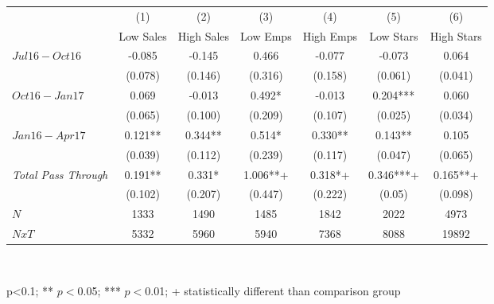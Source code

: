 \begin{center}
\begin{tabular}{lcccccc}
\hline  & (1) & (2) & (3) & (4) & (5) & (6)\\
 & Low Sales & High Sales & Low Emps & High Emps & Low Stars & High Stars\\
\hline  $ Jul16-Oct16 $  & -0.085 & -0.145 & 0.466 & -0.077 & -0.073 & 0.064\\
 & (0.078) & (0.146) & (0.316) & (0.158) & (0.061) & (0.041)\\
 $ Oct16-Jan17 $  & 0.069 & -0.013 & 0.492* & -0.013 & 0.204*** & 0.060\\
 & (0.065) & (0.100) & (0.209) & (0.107) & (0.025) & (0.034)\\
 $ Jan16-Apr17 $  & 0.121** & 0.344** & 0.514* & 0.330** & 0.143** & 0.105\\
 & (0.039) & (0.112) & (0.239) & (0.117) & (0.047) & (0.065)\\
\hline \textit{Total Pass Through} & 0.191** & 0.331* & 1.006**+ & 0.318*+ & 0.346***+ & 0.165**+\\
  & (0.102) & (0.207) & (0.447) & (0.222) & (0.05) & (0.098)\\
\hline  $ N $  & 1333 & 1490 & 1485 & 1842 & 2022 & 4973\\
 $ NxT $  & 5332 & 5960 & 5940 & 7368 & 8088 & 19892\\
\hline\end{tabular}\\
\begin{tiny}p<0.1; ** $p<0$.05; *** $p<0$.01; + statistically different than comparison group\end{tiny}\\
\end{center}
